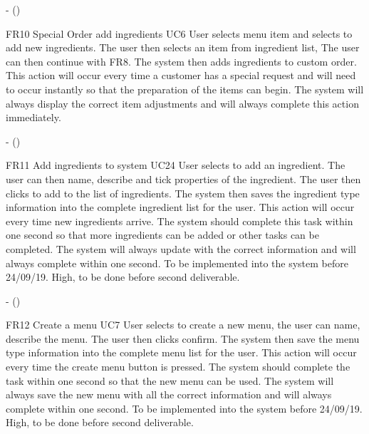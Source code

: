 \noindent \textbf{} -  ()\\
\begin{small}
	
\end{small}
\linebreak

FR10
Special Order add ingredients
UC6
User selects menu item and selects to add new ingredients. The user then selects an item from ingredient list, The user can then continue with FR8. The system then adds ingredients to custom order. This action will occur every time a customer has a special request and will need to occur instantly so that the preparation of the items can begin. The system will always display the correct item adjustments and  will always complete this action immediately.

\noindent \textbf{} -  ()\\
\begin{small}
	
\end{small}
\linebreak

FR11
Add ingredients to system
UC24
User selects to add an ingredient. The user can then name, describe and tick properties of the ingredient. The user then clicks to add to the list of ingredients. The system then saves the ingredient type information into the complete ingredient list for the user. This action will occur every time new ingredients arrive. The system should complete this task within one second so that more ingredients can be added or other tasks can be completed. The system will always update with the correct information and will always complete within one second. To be implemented into the system before 24/09/19.
High, to be done before second deliverable.

\noindent \textbf{} -  ()\\
\begin{small}
	
\end{small}
\linebreak

FR12
Create a menu
UC7
User selects to create a new menu, the user can name, describe the menu. The user then clicks confirm. The system then save the menu type information into the complete menu list for the user. This action will occur every time the create menu button is pressed. The system should complete the task within one second so that the new menu can be used. The system will always save the new menu with all the correct information and will always complete within one second. To be implemented into the system before 24/09/19. 
High, to be done before second deliverable.

